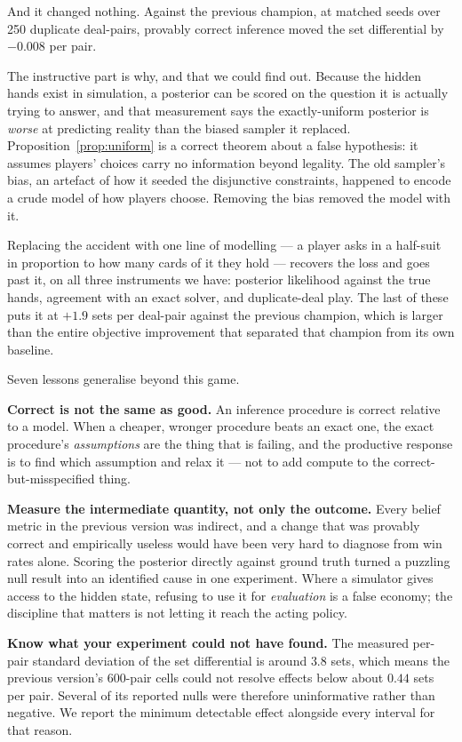 \documentclass[11pt,a4paper]{article}
\begin{document}
And it changed nothing. Against the previous champion, at matched seeds over 250
duplicate deal-pairs, provably correct inference moved the set differential by
$-0.008$ per pair.

The instructive part is why, and that we could find out. Because the hidden
hands exist in simulation, a posterior can be scored on the question it is
actually trying to answer, and that measurement says the exactly-uniform
posterior is \emph{worse} at predicting reality than the biased sampler it
replaced. Proposition~\ref{prop:uniform} is a correct theorem about a false
hypothesis: it assumes players' choices carry no information beyond legality.
The old sampler's bias, an artefact of how it seeded the disjunctive
constraints, happened to encode a crude model of how players choose. Removing
the bias removed the model with it.

Replacing the accident with one line of modelling --- a player asks in a
half-suit in proportion to how many cards of it they hold --- recovers the loss
and goes past it, on all three instruments we have: posterior likelihood against
the true hands, agreement with an exact solver, and duplicate-deal play. The
last of these puts it at $+1.9$ sets per deal-pair against the previous
champion, which is larger than the entire objective improvement that separated
that champion from its own baseline.

Seven lessons generalise beyond this game.

\textbf{Correct is not the same as good.} An inference procedure is correct
relative to a model. When a cheaper, wronger procedure beats an exact one, the
exact procedure's \emph{assumptions} are the thing that is failing, and the
productive response is to find which assumption and relax it --- not to add
compute to the correct-but-misspecified thing.

\textbf{Measure the intermediate quantity, not only the outcome.} Every belief
metric in the previous version was indirect, and a change that was provably
correct and empirically useless would have been very hard to diagnose from win
rates alone. Scoring the posterior directly against ground truth turned a
puzzling null result into an identified cause in one experiment. Where a
simulator gives access to the hidden state, refusing to use it for
\emph{evaluation} is a false economy; the discipline that matters is not letting
it reach the acting policy.

\textbf{Know what your experiment could not have found.} The measured per-pair
standard deviation of the set differential is around $3.8$ sets, which means the
previous version's 600-pair cells could not resolve effects below about $0.44$
sets per pair. Several of its reported nulls were therefore uninformative rather
than negative. We report the minimum detectable effect alongside every interval
for that reason.
\end{document}
